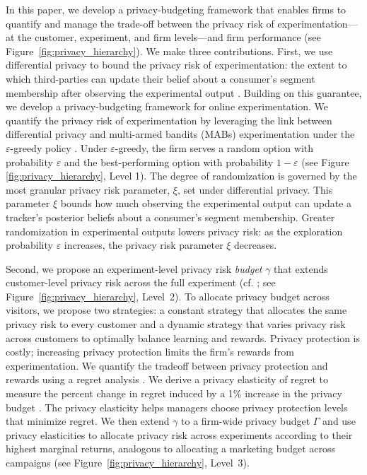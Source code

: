 \documentclass[mksc,nonblindrev]{informs3}
\begin{document}
In this paper, we develop a privacy-budgeting framework that enables firms to quantify and manage the trade-off between the privacy risk of experimentation—at the customer, experiment, and firm levels—and firm performance (see Figure~\ref{fig:privacy_hierarchy}).
We make three contributions. First, we use differential privacy to bound the privacy risk of experimentation: the extent to which third-parties can update their belief about a consumer's segment membership after observing the experimental output \citep{Dwork_2014}. Building on this guarantee, we develop a privacy-budgeting framework for online experimentation. We quantify the privacy risk of experimentation by leveraging the link between differential privacy and multi-armed bandits (MABs) experimentation under the $\varepsilon$-greedy policy \citep{Sutton1998}. Under $\varepsilon$-greedy, the firm serves a random option with probability $\varepsilon$ and the best-performing option with probability $1-\varepsilon$ (see Figure \ref{fig:privacy_hierarchy}, Level 1). The degree of randomization is governed by the most granular privacy risk parameter, $\xi$, set under differential privacy. This parameter $\xi$ bounds how much observing the experimental output can update a tracker's posterior beliefs about a consumer's segment membership. Greater randomization in experimental outputs lowers privacy risk: as the exploration probability $\varepsilon$ increases, the privacy risk parameter $\xi$ decreases.

Second, we propose an experiment-level privacy risk \textit{budget} $\gamma$ that extends customer-level privacy risk across the full experiment (cf. \citealp{Christoph2026PrivacyBudget}; see Figure~\ref{fig:privacy_hierarchy}, Level~2). To allocate privacy budget across visitors, we propose two strategies: a constant strategy that allocates the same privacy risk to every customer and a dynamic strategy that varies privacy risk across customers to optimally balance learning and rewards. Privacy protection is costly; increasing privacy protection limits the firm's rewards from experimentation. We quantify the tradeoff between privacy protection and rewards using a regret analysis \citep[also see][]{Hsu_2014}. We derive a privacy elasticity of regret to measure the percent change in regret induced by a 1\% increase in the privacy budget \citep[cf.][]{NBERw30215}. The privacy elasticity helps managers choose privacy protection levels that minimize regret. We then extend $\gamma$ to a firm-wide privacy budget $\Gamma$ and use privacy elasticities to allocate privacy risk across experiments according to their highest marginal returns, analogous to allocating a marketing budget across campaigns \citep[e.g.,][]{Fischer_2011, Peers_2017, ZiaRao2019} (see Figure~\ref{fig:privacy_hierarchy}, Level~3).
\end{document}
